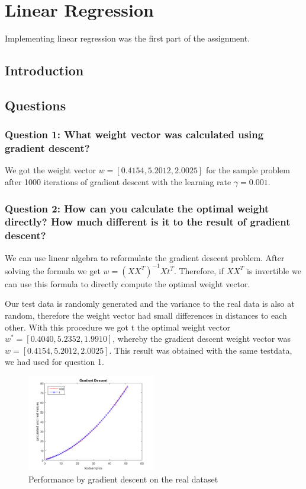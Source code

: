 \section{Linear Regression}

Implementing linear regression was the first part of the assignment.

\subsection{Introduction}



\subsection{Questions}

\subsubsection{Question 1: What weight vector was calculated using gradient descent?}

We got the weight vector $w = [0.4154, 5.2012, 2.0025]$ for the sample problem after 1000 iterations of gradient descent with the learning rate $\gamma = 0.001$.

\subsubsection{Question 2: How can you calculate the optimal weight directly? How much different is it to the result of gradient descent?}

We can use linear algebra to reformulate the gradient descent problem. After solving the formula we get $w = (XX^T)^{-1}Xt^T$. Therefore, if $XX^T$ is invertible we can use this formula to directly compute the optimal weight vector.

Our test data is randomly generated and the variance to the real data is also at random, therefore the weight vector had small differences in distances to each other. With this procedure we got t the optimal weight vector $w^* = [0.4040, 5.2352, 1.9910]$, whereby the gradient descent weight vector was $w = [0.4154, 5.2012, 2.0025]$. This result was obtained with the same testdata, we had used for question 1. 

\begin{figure}[!ht]
	\centering
	\includegraphics[width=0.5\textwidth]{img/gradientDescent}
	\caption{Performance by gradient descent on the real dataset}
	\label{perGraDescent}
\end{figure}


